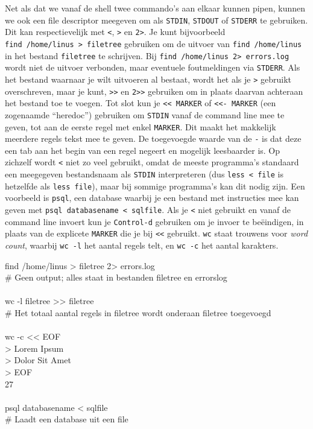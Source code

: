 Net als dat we vanaf de shell twee commando's aan elkaar kunnen pipen, kunnen we ook een file descriptor meegeven om als \texttt{STDIN}, \texttt{STDOUT} of \texttt{STDERR} te gebruiken. Dit kan respectievelijk met \texttt{\textless{}}, \texttt{\textgreater{}} en \texttt{2\textgreater{}}. Je kunt bijvoorbeeld \texttt{find\ /home/linus\ \textgreater{}\ filetree} gebruiken om de uitvoer van \texttt{find\ /home/linus} in het bestand \texttt{filetree} te schrijven. Bij \texttt{find\ /home/linus\ 2\textgreater{}\ errors.log} wordt niet de uitvoer verbonden, maar eventuele foutmeldingen via \texttt{STDERR}. Als het bestand waarnaar je wilt uitvoeren al bestaat, wordt het als je \texttt{\textgreater{}} gebruikt overschreven, maar je kunt, \texttt{\textgreater{}\textgreater{}} en \texttt{2\textgreater{}\textgreater{}} gebruiken om in plaats daarvan achteraan het bestand toe te voegen. Tot slot kun je \texttt{\textless{}\textless{}\ MARKER} of \texttt{\textless{}\textless{}-\ MARKER} (een zogenaamde ``heredoc'') gebruiken om \texttt{STDIN} vanaf de command line mee te geven, tot aan de eerste regel met enkel \texttt{MARKER}. Dit maakt het makkelijk meerdere regels tekst mee te geven. De toegevoegde waarde van de \texttt{-} is dat deze een tab aan het begin van een regel negeert en mogelijk leesbaarder is. Op zichzelf wordt \texttt{\textless{}} niet zo veel gebruikt, omdat de meeste programma's standaard een meegegeven bestandsnaam als \texttt{STDIN} interpreteren (dus \texttt{less\ \textless{}\ file} is hetzelfde als \texttt{less\ file}), maar bij sommige programma's kan dit nodig zijn. Een voorbeeld is \texttt{psql}, een database waarbij je een bestand met instructies mee kan geven met \texttt{psql\ databasename\ \textless{}\ sqlfile}. Als je \texttt{\textless{}} niet gebruikt en vanaf de command line invoert kun je \texttt{Control-d} gebruiken om je invoer te beëindigen, in plaats van de explicete \texttt{MARKER} die je bij \texttt{\textless{}\textless{}} gebruikt. \texttt{wc} staat trouwens voor \emph{word count}, waarbij \texttt{wc\ -l} het aantal regels telt, en \texttt{wc\ -c} het aantal karakters.

\begin{bash}
\p[~] find /home/linus > filetree 2> errors.log\\
\# Geen output; alles staat in bestanden filetree en errorslog\\
\\
\p[~] wc -l filetree >\!> filetree\\
\# Het totaal aantal regels in filetree wordt onderaan filetree toegevoegd\\
\\
\p[~] wc -c <\!< EOF\\
> Lorem Ipsum\\
> Dolor Sit Amet\\
> EOF\\
27\\
\\
\p[~] psql databasename < sqlfile\\
\# Laadt een database uit een file\\
\end{bash}

